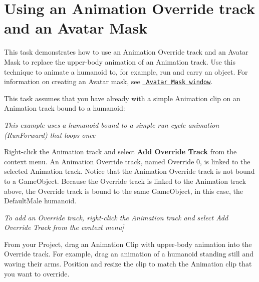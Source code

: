 \chapter{Using an Animation Override track and an Avatar Mask}
\hypertarget{md__hey_tea_9_2_library_2_package_cache_2com_8unity_8timeline_0d1_87_85_2_documentation_0i_2wf__mask}{}\label{md__hey_tea_9_2_library_2_package_cache_2com_8unity_8timeline_0d1_87_85_2_documentation_0i_2wf__mask}
\label{md__hey_tea_9_2_library_2_package_cache_2com_8unity_8timeline_0d1_87_85_2_documentation_0i_2wf__mask_autotoc_md4772}%
%
 This task demonstrates how to use an Animation Override track and an Avatar Mask to replace the upper-\/body animation of an Animation track. Use this technique to animate a humanoid to, for example, run and carry an object. For information on creating an Avatar mask, see \href{https://docs.unity3d.com/Manual/class-AvatarMask.html}{\texttt{ Avatar Mask window}}.

This task assumes that you have already  with a simple Animation clip on an Animation track bound to a humanoid\+:



{\itshape This example uses a humanoid bound to a simple run cycle animation (Run\+Forward) that loops once}

Right-\/click the Animation track and select {\bfseries{Add Override Track}} from the context menu. An Animation Override track, named Override 0, is linked to the selected Animation track. Notice that the Animation Override track is not bound to a Game\+Object. Because the Override track is linked to the Animation track above, the Override track is bound to the same Game\+Object, in this case, the Default\+Male humanoid.



{\itshape To add an Override track, right-\/click the Animation track and select Add Override Track from the context menu\mbox{]}}

From your Project, drag an Animation Clip with upper-\/body animation into the Override track. For example, drag an animation of a humanoid standing still and waving their arms. Position and resize the clip to match the Animation clip that you want to override.



